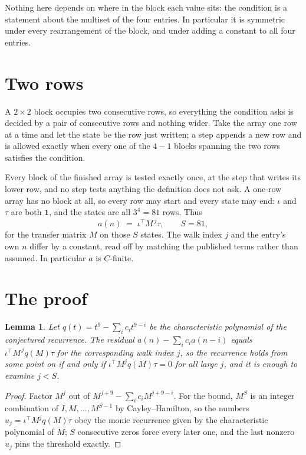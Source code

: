 \documentclass[11pt,a4paper]{article}
\theoremstyle{plain}
\newtheorem{lemma}[theorem]{Lemma}
\theoremstyle{definition}
\begin{document}
Nothing here depends on where in the block each value sits: the condition is a statement about
the multiset of the four entries. In particular it is symmetric under every rearrangement of
the block, and under adding a constant to all four entries.

\section{Two rows}

A $2\times2$ block occupies two consecutive rows, so everything the condition asks is decided
by a pair of consecutive rows and nothing wider. Take the array one row at a time and let the
state be the row just written; a step appends a new row and is allowed exactly when every one
of the $4-1$ blocks spanning the two rows satisfies the condition.

Every block of the finished array is tested exactly once, at the step that writes its lower
row, and no step tests anything the definition does not ask. A one-row array has no block at
all, so every row may start and every state may end: $\iota$ and $\tau$ are both
$\mathbf{1}$, and the states are all $3^{4}=81$ rows. Thus
\[
a(n)\;=\;\iota^{\!\top}M^{\,j}\tau ,\qquad S=81,
\]
for the transfer matrix $M$ on those $S$ states. The walk index $j$ and the entry's own $n$
differ by a constant, read off by matching the published terms rather than assumed. In
particular $a$ is $C$-finite.

\section{The proof}

\begin{lemma}\label{lem:crit}
Let $q(t)=t^{9}-\sum_i c_it^{9-i}$ be the characteristic polynomial of the
conjectured recurrence. The residual $a(n)-\sum_ic_ia(n-i)$ equals
$\iota^{\!\top}M^{\,j}q(M)\tau$ for the corresponding walk index $j$, so the recurrence
holds from some point on if and only if $\iota^{\!\top}M^{j}q(M)\tau=0$ for all large $j$,
and it is enough to examine $j<S$.
\end{lemma}

\begin{proof}
Factor $M^{j}$ out of $M^{j+9}-\sum_ic_iM^{j+9-i}$. For the bound, $M^{S}$
is an integer combination of $I,M,\dots,M^{S-1}$ by Cayley--Hamilton, so the numbers
$u_j=\iota^{\!\top}M^{j}q(M)\tau$ obey the monic recurrence given by the characteristic
polynomial of $M$; $S$ consecutive zeros force every later one, and the last nonzero $u_j$
pins the threshold exactly.
\end{proof}
\end{document}
